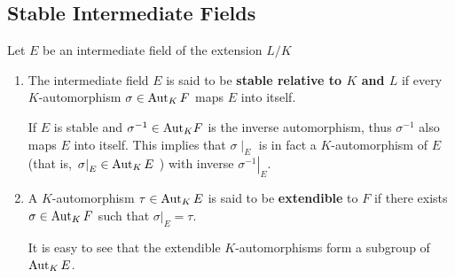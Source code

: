 \subsection{Stable Intermediate Fields} %
\begin{definition}
    Let $E$ be an intermediate field of the extension $L/K$
    \begin{enumerate}
        \item
              The intermediate field $E$ is said to be \textbf{stable relative to $K$ and $L$} if every $K$-automorphism $\sigma \in \operatorname{\operatorname{Aut}}_K F$ maps $E$ into itself.
              \begin{remark}
                  If $E$ is stable and $\sigma^{-1} \in {\operatorname{\operatorname{Aut}}}_K F$ is the inverse automorphism, thus $\sigma^{-1}$ also maps $E$ into itself.
                  This implies that $\sigma \mid_E$ is in fact a $K$-automorphism of $E$ (that is, $\left.\sigma\right|_E \in \operatorname{\operatorname{Aut}}_K E$ ) with inverse $\left.\sigma^{-1}\right|_E$.
              \end{remark}

        \item
              A $K$-automorphism $\tau \in \operatorname{\operatorname{Aut}}_K E$ is said to be \textbf{extendible} to $F$ if there exists $\sigma \in \operatorname{\operatorname{Aut}}_K F$ such that $\left.\sigma\right|_E=\tau$.

              It is easy to see that the extendible $K$-automorphisms form a subgroup of $\operatorname{\operatorname{Aut}}_K E$.
    \end{enumerate}
\end{definition}

